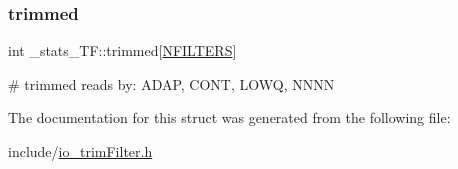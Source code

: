 \subsubsection{\texorpdfstring{trimmed}{trimmed}}
{\footnotesize\ttfamily int \+\_\+stats\+\_\+\+T\+F\+::trimmed\mbox{[}\mbox{\hyperlink{defines_8h_a23f1103d8247781ab0be4b0fba2f085f}{N\+F\+I\+L\+T\+E\+RS}}\mbox{]}}

\# trimmed reads by\+: A\+D\+AP, C\+O\+NT, L\+O\+WQ, N\+N\+NN 

The documentation for this struct was generated from the following file\+:\begin{DoxyCompactItemize}
\item 
include/\mbox{\hyperlink{io__trimFilter_8h}{io\+\_\+trim\+Filter.\+h}}\end{DoxyCompactItemize}
